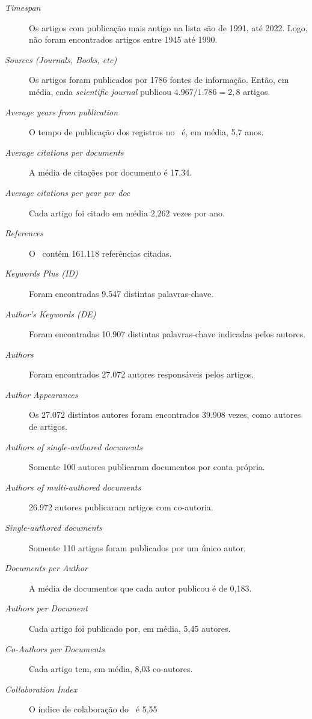 \begin{description}
    \item [\textit{Timespan}] Os artigos com publicação mais antigo na lista são de 1991, até 2022. Logo, não foram encontrados artigos entre 1945 até 1990.
    \item [\textit{Sources (Journals, Books, etc)}] Os artigos foram publicados por 1786 fontes de informação. Então, em média, cada \textit{scientific journal} publicou $4.967/1.786=2,8$ artigos.
    \item [\textit{Average years from publication}] O tempo de publicação dos registros no \dataset\ é, em média, 5,7 anos.
    \item [\textit{Average citations per documents}] A média de citações por documento é 17,34.
    \item [\textit{Average citations per year per doc}] Cada artigo foi citado em média 2,262 vezes por ano.
    \item [\textit{References}] O \dataset\  contém 161.118 referências citadas.
    \item [\textit{Keywords Plus (ID)}] Foram encontradas 9.547 distintas palavras-chave.
    \item [\textit{Author's Keywords (DE)}] Foram encontradas 10.907 distintas palavras-chave indicadas pelos autores.
    \item [\textit{Authors}] Foram encontrados 27.072 autores responsáveis pelos artigos.
    \item [\textit{Author Appearances}] Os 27.072 distintos  autores foram encontrados 39.908 vezes, como autores de artigos.
    \item [\textit{Authors of single-authored documents}] Somente 100 autores publicaram documentos por conta própria.
    \item [\textit{Authors of multi-authored documents}] 26.972 autores publicaram artigos com co-autoria.
    \item [\textit{Single-authored documents}] Somente 110 artigos foram publicados por um único autor.
    \item [\textit{Documents per Author}] A média de documentos que cada autor publicou é de 0,183.
    \item [\textit{Authors per Document}] Cada artigo foi publicado por, em média, 5,45 autores.
    \item [\textit{Co-Authors per Documents}] Cada artigo tem, em média, 8,03 co-autores.
    \item [\textit{Collaboration Index}] O índice de colaboração do \dataset\ é 5,55
\end{description}

